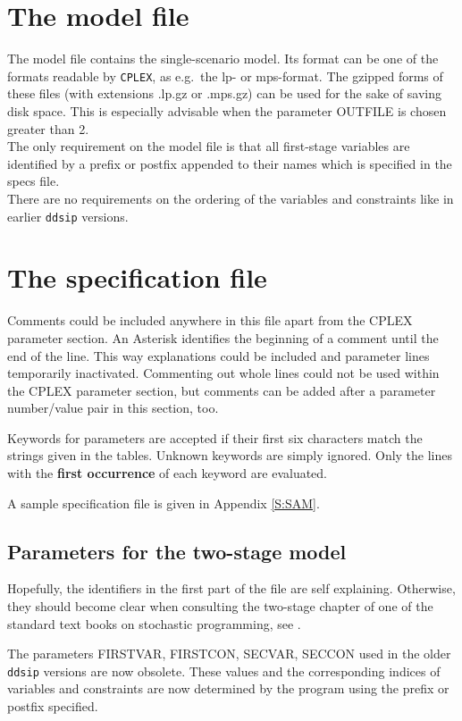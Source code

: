 \documentclass[11pt,draft]{article}
\newcommand{\+}{{\ti{+}}}
\newcommand{\1}{{\ti{1}}}
\begin{document}
\section{The model file}
The model file contains the single-scenario model. Its format can be one of the formats readable by
\texttt{CPLEX}, as e.g.\ the lp- or mps-format. The gzipped forms of these files (with extensions .lp.gz or .mps.gz)
can be used for the sake of saving disk space. This is especially advisable when the parameter OUTFILE is chosen greater than 2.\\
The only requirement on the model file is that all first-stage variables are identified by a prefix or postfix
appended to their names which is specified in the specs file.\\
There are no requirements on the ordering of the variables and constraints like in earlier \texttt{ddsip} versions.
%
\section{The specification file}
Comments could be included anywhere in this file apart from the CPLEX parameter section.
An Asterisk identifies the beginning of a comment until the end of the line.
This way explanations could be included and parameter lines temporarily inactivated.
Commenting out whole lines could not be used within the CPLEX parameter section, but comments can be added after a parameter number/value pair in this section, too.

Keywords for parameters are accepted if their first six characters match the strings given in the tables.
Unknown keywords are simply ignored. Only the lines with the {\bf first occurrence} of each keyword are evaluated.

A sample specification file is given in Appendix \ref{S:SAM}. %
\subsection{Parameters for the two-stage model}
Hopefully, the identifiers in the first part of the file are self explaining. Otherwise, they should
become clear when consulting the two-stage chapter of one of the standard text books on stochastic
programming, see \cite{bir,kal,pre}.

The parameters FIRSTVAR, FIRSTCON, SECVAR, SECCON  used in the older \texttt{ddsip} versions are now obsolete.
These values and the corresponding indices of variables and constraints are now determined by the program
using the prefix or postfix specified.
\end{document}
